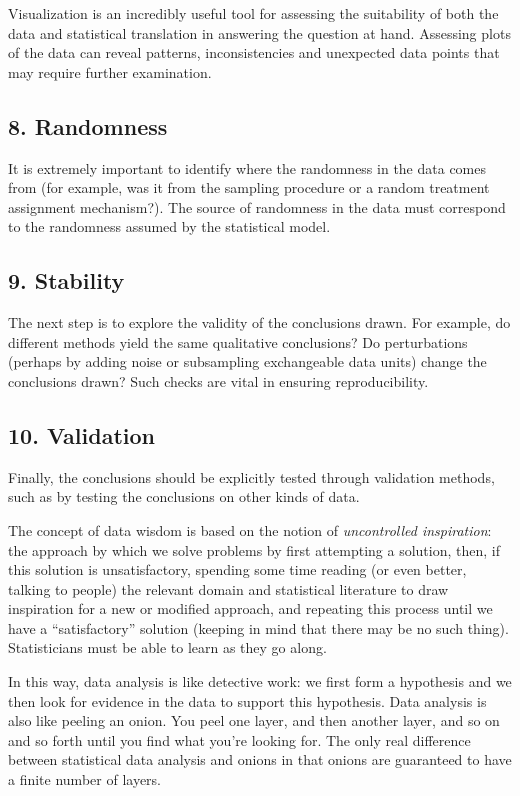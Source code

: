 Visualization is an incredibly useful tool for assessing the suitability of both the data and statistical translation in answering the question at hand. Assessing plots of the data can reveal patterns, inconsistencies and unexpected data points that may require further examination. 

\subsection*{8. Randomness}

It is extremely important to identify where the randomness in the data comes from (for example, was it from the sampling procedure or a random treatment assignment mechanism?). The source of randomness in the data must correspond to the randomness assumed by the statistical model. 

\subsection*{9. Stability}

The next step is to explore the validity of the conclusions drawn. For example, do different methods yield the same qualitative conclusions? Do perturbations (perhaps by adding noise or subsampling exchangeable data units) change the conclusions drawn? Such checks are vital in ensuring reproducibility. 

\subsection*{10. Validation}

Finally, the conclusions should be explicitly tested through validation methods, such as by testing the conclusions on other kinds of data.



The concept of data wisdom is based on the notion of \emph{uncontrolled inspiration}: the approach by which we solve problems by first attempting a solution, then, if this solution is unsatisfactory, spending some time reading (or even better, talking to people) the relevant domain and statistical literature to draw inspiration for a new or modified approach, and repeating this process until we have a ``satisfactory'' solution (keeping in mind that there may be no such thing). Statisticians must be able to learn as they go along.

In this way, data analysis is like detective work: we first form a hypothesis and we then look for evidence in the data to support this hypothesis. Data analysis is also like peeling an onion. You peel one layer, and then another layer, and so on and so forth until you find what you're looking for. The only real difference between statistical data analysis and onions in that onions are guaranteed to have a finite number of layers.

